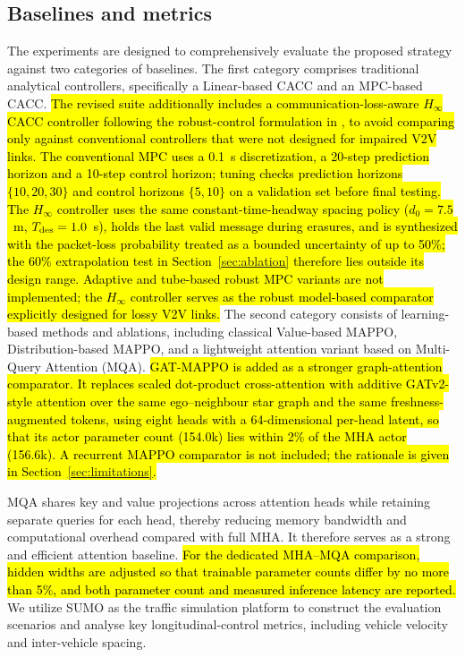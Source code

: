 \documentclass{ieeeaccess}
\begin{document}
\subsection{Baselines and metrics}
The experiments are designed to comprehensively evaluate the proposed strategy against two categories of baselines. The first category comprises traditional analytical controllers, specifically a Linear-based CACC and an MPC-based CACC. \hl{The revised suite additionally includes a communication-loss-aware $H_\infty$ CACC controller following the robust-control formulation in \cite{YANG2025103212}, to avoid comparing only against conventional controllers that were not designed for impaired V2V links. The conventional MPC uses a 0.1~s discretization, a 20-step prediction horizon and a 10-step control horizon; tuning checks prediction horizons $\{10,20,30\}$ and control horizons $\{5,10\}$ on a validation set before final testing.} %
\hl{The $H_\infty$ controller uses the same constant-time-headway spacing policy ($d_0=7.5$~m, $T_{\rm des}=1.0$~s), holds the last valid message during erasures, and is synthesized with the packet-loss probability treated as a bounded uncertainty of up to 50\%; the 60\% extrapolation test in Section~\ref{sec:ablation} therefore lies outside its design range. Adaptive and tube-based robust MPC variants are not implemented; the $H_\infty$ controller serves as the robust model-based comparator explicitly designed for lossy V2V links.} %
The second category consists of learning-based methods and ablations, including classical Value-based MAPPO, Distribution-based MAPPO, and a lightweight attention variant based on Multi-Query Attention (MQA). \hl{GAT-MAPPO is added as a stronger graph-attention comparator. It replaces scaled dot-product cross-attention with additive GATv2-style attention over the same ego--neighbour star graph and the same freshness-augmented tokens, using eight heads with a 64-dimensional per-head latent, so that its actor parameter count (154.0k) lies within 2\% of the MHA actor (156.6k). A recurrent MAPPO comparator is not included; the rationale is given in Section~\ref{sec:limitations}.} %

MQA shares key and value projections across attention heads while retaining separate queries for each head, thereby reducing memory bandwidth and computational overhead compared with full MHA. It therefore serves as a strong and efficient attention baseline. \hl{For the dedicated MHA--MQA comparison, hidden widths are adjusted so that trainable parameter counts differ by no more than 5\%, and both parameter count and measured inference latency are reported.} %
We utilize SUMO as the traffic simulation platform to construct the evaluation scenarios and analyse key longitudinal-control metrics, including vehicle velocity and inter-vehicle spacing.
\end{document}
